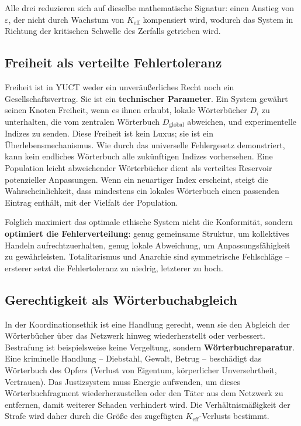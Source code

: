 \documentclass[12pt,a4paper]{article}
\begin{document}
Alle drei reduzieren sich auf dieselbe mathematische Signatur: einen Anstieg von \(\varepsilon\), der nicht durch Wachstum von \(K_{\mathrm{eff}}\) kompensiert wird, wodurch das System in Richtung der kritischen Schwelle des Zerfalls getrieben wird.

\subsection{Freiheit als verteilte Fehlertoleranz}

Freiheit ist in YUCT weder ein unveräußerliches Recht noch ein Gesellschaftsvertrag. Sie ist ein \textbf{technischer Parameter}. Ein System gewährt seinen Knoten Freiheit, wenn es ihnen erlaubt, lokale Wörterbücher \(D_i\) zu unterhalten, die vom zentralen Wörterbuch \(D_{\text{global}}\) abweichen, und experimentelle Indizes zu senden. Diese Freiheit ist kein Luxus; sie ist ein Überlebensmechanismus. Wie durch das universelle Fehlergesetz demonstriert, kann kein endliches Wörterbuch alle zukünftigen Indizes vorhersehen. Eine Population leicht abweichender Wörterbücher dient als verteiltes Reservoir potenzieller Anpassungen. Wenn ein neuartiger Index erscheint, steigt die Wahrscheinlichkeit, dass mindestens ein lokales Wörterbuch einen passenden Eintrag enthält, mit der Vielfalt der Population.

Folglich maximiert das optimale ethische System nicht die Konformität, sondern \textbf{optimiert die Fehlerverteilung}: genug gemeinsame Struktur, um kollektives Handeln aufrechtzuerhalten, genug lokale Abweichung, um Anpassungsfähigkeit zu gewährleisten. Totalitarismus und Anarchie sind symmetrische Fehlschläge – ersterer setzt die Fehlertoleranz zu niedrig, letzterer zu hoch.

\subsection{Gerechtigkeit als Wörterbuchabgleich}

In der Koordinationsethik ist eine Handlung gerecht, wenn sie den Abgleich der Wörterbücher über das Netzwerk hinweg wiederherstellt oder verbessert. Bestrafung ist beispielsweise keine Vergeltung, sondern \textbf{Wörterbuchreparatur}. Eine kriminelle Handlung – Diebstahl, Gewalt, Betrug – beschädigt das Wörterbuch des Opfers (Verlust von Eigentum, körperlicher Unversehrtheit, Vertrauen). Das Justizsystem muss Energie aufwenden, um dieses Wörterbuchfragment wiederherzustellen oder den Täter aus dem Netzwerk zu entfernen, damit weiterer Schaden verhindert wird. Die Verhältnismäßigkeit der Strafe wird daher durch die Größe des zugefügten \(K_{\mathrm{eff}}\)-Verlusts bestimmt.
\end{document}
